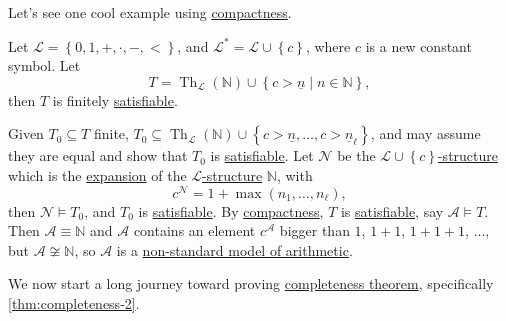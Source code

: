 Let's see one cool example using \hyperref[thm:compactness]{compactness}.

\begin{eg}\label{eg:construction-non-standard-model-of-arithmetic}
	Let \(\mathcal{L} = \left\{ 0, 1, +, \cdot, -, < \right\} \), and \(\mathcal{L} ^{\ast} = \mathcal{L} \cup \left\{ c \right\} \), where \(c\) is a new constant symbol. Let
	\[
		T = \mathop{\mathrm{Th}}\nolimits_{\mathcal{L} }(\mathbb{N} ) \cup \left\{ c > \underline{n} \mid n \in \mathbb{N}  \right\} ,
	\]
	then \(T\) is finitely \hyperref[def:satisfiable]{satisfiable}.
\end{eg}
\begin{explanation}
	Given \(T_0 \subseteq T\) finite, \(T_0 \subseteq \mathop{\mathrm{Th}}\nolimits_{\mathcal{L} }(\mathbb{N} ) \cup \left\{ c> \underline{n}, \ldots , c>\underline{n}_{\ell }  \right\} \), and may assume they are equal and show that \(T_0\) is \hyperref[def:satisfiable]{satisfiable}. Let \(\mathcal{N} \) be the \hyperref[def:structure]{\(\mathcal{L} \cup \left\{ c \right\} \)-structure} which is the \hyperref[not:expansion]{expansion} of the \hyperref[def:structure]{\(\mathcal{L} \)-structure} \(\mathbb{N} \), with
	\[
		c^{\mathcal{N} }  = 1 + \max (n_1, \ldots , n_{\ell } ),
	\]
	then \(\mathcal{N} \models T_0\), and \(T_0\) is \hyperref[def:satisfiable]{satisfiable}. By \hyperref[thm:compactness]{compactness}, \(T\) is \hyperref[def:satisfiable]{satisfiable}, say \(\mathcal{A} \models T\). Then \(\mathcal{A} \equiv \mathbb{N} \) and \(\mathcal{A} \) contains an element \(c^{\mathcal{A} } \) bigger than \(1\), \(1+1\), \(1+1+1\), ..., but \(\mathcal{A} \not \cong \mathbb{N} \), so \(\mathcal{A} \) is a \hyperref[rmk:non-standard-model-of-arithmetic]{non-standard model of arithmetic}.
\end{explanation}

We now start a long journey toward proving \hyperref[thm:completeness]{completeness theorem}, specifically \autoref{thm:completeness-2}.